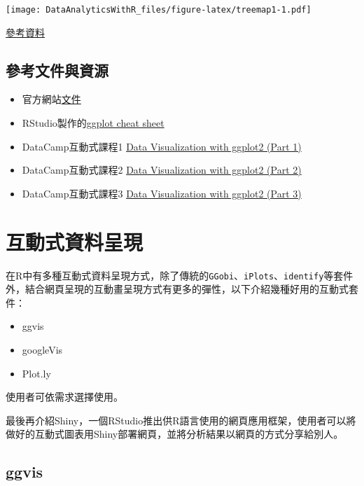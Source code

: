 \documentclass[]{book}
\providecommand{\tightlist}{%
  \setlength{\itemsep}{0pt}\setlength{\parskip}{0pt}}
\theoremstyle{definition}
\theoremstyle{definition}
\theoremstyle{remark}
\begin{document}
\texttt{[image: DataAnalyticsWithR\_files/figure-latex/treemap1-1.pdf]}

\href{https://github.com/wilkox/treemapify}{參考資料}

\section{參考文件與資源}\label{-2}

\begin{itemize}
\tightlist
\item
  官方網站\href{http://docs.ggplot2.org/current/}{文件}
\item
  RStudio製作的\href{https://www.rstudio.com/wp-content/uploads/2016/11/ggplot2-cheatsheet-2.1.pdf}{ggplot
  cheat sheet}
\item
  DataCamp互動式課程1
  \href{https://www.datacamp.com/courses/data-visualization-with-ggplot2-1}{Data
  Visualization with ggplot2 (Part 1)}
\item
  DataCamp互動式課程2
  \href{https://www.datacamp.com/courses/data-visualization-with-ggplot2-2}{Data
  Visualization with ggplot2 (Part 2)}
\item
  DataCamp互動式課程3
  \href{https://www.datacamp.com/courses/data-visualization-with-ggplot2-3}{Data
  Visualization with ggplot2 (Part 3)}
\end{itemize}

\chapter{互動式資料呈現}\label{InteractiveGraphics}

在R中有多種互動式資料呈現方式，除了傳統的\texttt{GGobi}、\texttt{iPlots}、\texttt{identify}等套件外，結合網頁呈現的互動畫呈現方式有更多的彈性，以下介紹幾種好用的互動式套件：

\begin{itemize}
\tightlist
\item
  ggvis
\item
  googleVis
\item
  Plot.ly
\end{itemize}

使用者可依需求選擇使用。

最後再介紹Shiny，一個RStudio推出供R語言使用的網頁應用框架，使用者可以將做好的互動式圖表用Shiny部署網頁，並將分析結果以網頁的方式分享給別人。

\section{ggvis}\label{ggvis}
\end{document}
